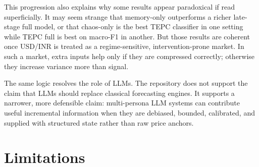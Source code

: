 \documentclass[11pt,a4paper]{article}
\begin{document}
This progression also explains why some results appear paradoxical if read superficially. It may seem strange that memory-only outperforms a richer late-stage full model, or that chaos-only is the best TEPC classifier in one setting while TEPC full is best on macro-F1 in another. But those results are coherent once USD/INR is treated as a regime-sensitive, intervention-prone market. In such a market, extra inputs help only if they are compressed correctly; otherwise they increase variance more than signal.

The same logic resolves the role of LLMs. The repository does not support the claim that LLMs should replace classical forecasting engines. It supports a narrower, more defensible claim: multi-persona LLM systems can contribute useful incremental information when they are debiased, bounded, calibrated, and supplied with structured state rather than raw price anchors.

\section{Limitations}
\end{document}
